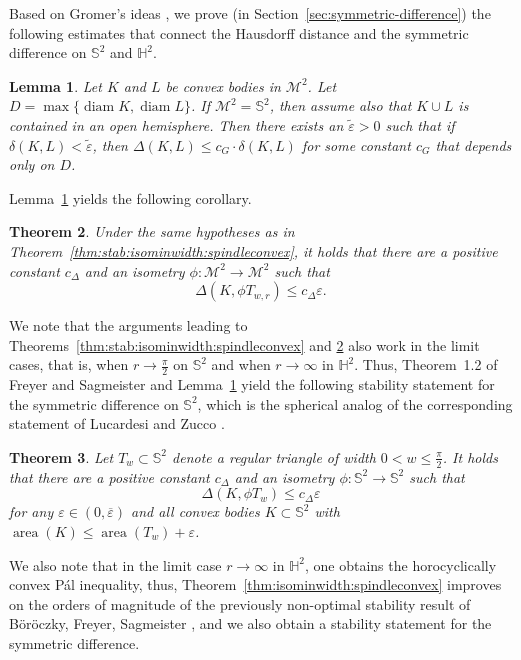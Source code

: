\documentclass[12pt,reqno]{amsart}
\newtheorem{theorem}{Theorem}[section]
\newtheorem{lemma}[theorem]{Lemma}
\theoremstyle{remark}
\newcommand{\hyp}{{\mathbb H}}
\newcommand{\sph}{{\mathbb S}}
\newcommand{\M}{\mathcal{M}}
\DeclareMathOperator{\diam}{\mathrm{diam}}
\DeclareMathOperator{\area}{\mathrm{area}}
\begin{document}

Based on Gromer's ideas \cite{G00}, we prove (in Section~\ref{sec:symmetric-difference}) the following estimates that connect the Hausdorff distance and the symmetric difference on $\sph^2$ and $\hyp^2$.

\begin{lemma}\label{lem:groemer-noneuclidean-taylor}
Let $K$ and $L$ be convex bodies in $\M^2$. Let $D=\max\{\diam K,\diam L\}$. If $\M^2=\sph^2$, then assume also that $K\cup L$ is contained in an open hemisphere. Then there exists an $\tilde{\varepsilon}>0$ such that if $\delta(K,L)<\tilde{\varepsilon}$, then
$\Delta(K,L)\leq c_G\cdot\delta (K,L)$ for some constant $c_G$ that depends only on $D$.
\end{lemma}

Lemma~\ref{lem:groemer-noneuclidean-taylor} yields the following corollary.

\begin{theorem}
\label{thm:stab:symmetric-difference}
    Under the same hypotheses as in Theorem~\ref{thm:stab:isominwidth:spindleconvex}, it holds that
 there are a positive constant $c_\Delta$ and an isometry $\phi\colon\M^2\to\M^2$ such that
$$
\Delta(K,\phi T_{w,r})\leq c_\Delta\varepsilon.
$$ 
\end{theorem}

We note that the arguments leading to Theorems~\ref{thm:stab:isominwidth:spindleconvex} and \ref{thm:stab:symmetric-difference} also work in the limit cases, that is, when $r\to \frac{\pi}{2}$ on $\sph^2$ and when $r\to\infty$ in $\hyp^2$. Thus, Theorem~1.2 of Freyer and Sagmeister \cite{FS} and Lemma~\ref{lem:groemer-noneuclidean-taylor} yield the following stability statement for the symmetric difference on $\sph^2$, which is the spherical analog of the corresponding statement of Lucardesi and Zucco \cite{LZ24}.
\begin{theorem}\label{thm:spherical-symmetric-differene}
Let $T_w\subset\sph^2$ denote a regular triangle of width $0<w\leq\frac{\pi}{2}$. It holds that there are a positive constant $c_\Delta$ and an isometry $\phi\colon\sph^2\to\sph^2$ such that
$$
\Delta(K,\phi T_w)\leq c_\Delta\varepsilon
$$
for any $\varepsilon\in(0,\overline{\varepsilon})$ and all convex bodies $K\subset\sph^2$ with $\area(K)\leq\area(T_w) + \varepsilon$.
\end{theorem}

We also note that in the limit case $r\to\infty$ in $\hyp^2$, one obtains the horocyclically convex P\'al inequality, thus, Theorem~\ref{thm:isominwidth:spindleconvex}
improves on the orders of magnitude of the previously non-optimal stability result of B\"or\"oczky, Freyer, Sagmeister \cite{BoFS}, and we also obtain a stability statement for the symmetric difference.
\end{document}
